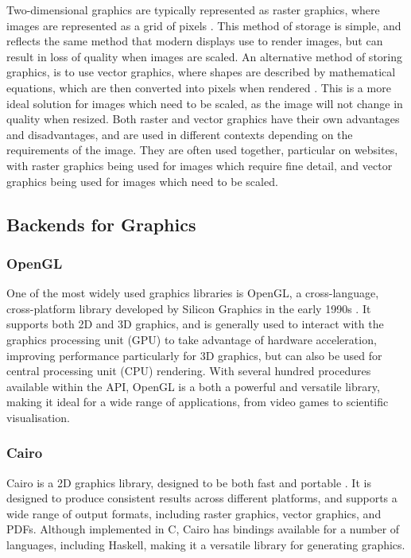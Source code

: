 \documentclass[../main.tex]{subfiles}
\begin{document}
        Two-dimensional graphics are typically represented as raster graphics, where
            images are represented as a grid of pixels \citep{rasterGraphics}.
        This method of storage is simple, and reflects the same method that modern
            displays use to render images, but can result in loss of quality when images
            are scaled.
        An alternative method of storing graphics, is to use vector graphics, where
            shapes are described by mathematical equations, which are then converted into
            pixels when rendered \citep{vectorGraphics}.
        This is a more ideal solution for images which need to be scaled, as the image
            will not change in quality when resized.
        Both raster and vector graphics have their own advantages and disadvantages,
            and are used in different contexts depending on the requirements of the image.
        They are often used together, particular on websites, with raster graphics
            being used for images which require fine detail, and vector graphics being used
            for images which need to be scaled.

        \subsection{Backends for Graphics}
            \subsubsection{OpenGL}
                One of the most widely used graphics libraries is OpenGL, a cross-language,
                    cross-platform library developed by Silicon Graphics in the early 1990s
                    \citep{openGL}.
                It supports both 2D and 3D graphics, and is generally used to interact with the
                    graphics processing unit (GPU) to take advantage of hardware acceleration,
                    improving performance particularly for 3D graphics, but can also be used for
                    central processing unit (CPU) rendering.
                With several hundred procedures available within the API, OpenGL is a both a
                    powerful and versatile library, making it ideal for a wide range of
                    applications, from video games to scientific visualisation.

            \subsubsection{Cairo}
                Cairo is a 2D graphics library, designed to be both fast and portable
                    \citep{cairo}.
                It is designed to produce consistent results across different platforms, and
                    supports a wide range of output formats, including raster graphics, vector
                    graphics, and PDFs.
                Although implemented in C, Cairo has bindings available for a number of
                    languages, including Haskell, making it a versatile library for generating
                    graphics.
\end{document}
